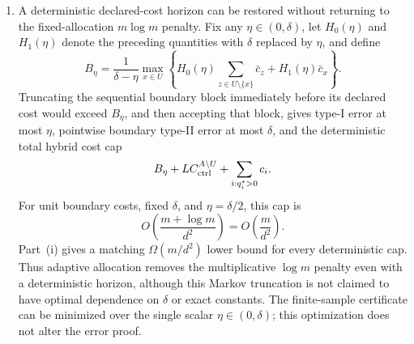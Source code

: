 \begin{theorem}
\begin{enumerate}[label=(\roman*)]
\item A deterministic declared-cost horizon can be restored without returning
to the fixed-allocation \(m\log m\) penalty.  Fix any
\(\eta\in(0,\delta)\), let \(H_0(\eta)\) and \(H_1(\eta)\) denote the preceding
quantities with \(\delta\) replaced by \(\eta\), and define
\begin{equation}\label{eq:formal-results-066}
B_\eta
=
\frac1{\delta-\eta}
\max_{x\in U}
\left\{
H_0(\eta)\sum_{z\in U\setminus\{x\}}\bar c_z
+H_1(\eta)\bar c_x
\right\}.
\end{equation}
Truncating the sequential boundary block immediately before its declared cost
would exceed \(B_\eta\), and then accepting that block, gives type-I error at
most \(\eta\), pointwise boundary type-II error at most \(\delta\), and the
deterministic total hybrid cost cap
\begin{equation}\label{eq:formal-results-067}
B_\eta
+L C_{\rm ctrl}^{A\setminus U}
+\sum_{i:q_i^\star>0}c_i.
\end{equation}
For unit boundary costs, fixed \(\delta\), and \(\eta=\delta/2\), this cap is
\begin{equation}\label{eq:formal-results-068}
O\!\left(\frac{m+\log m}{d^2}\right)
=O\!\left(\frac{m}{d^2}\right).
\end{equation}
Part~(i) gives a matching \(\Omega(m/d^2)\) lower bound for every deterministic
cap.  Thus adaptive allocation removes the multiplicative \(\log m\) penalty
even with a deterministic horizon, although this Markov truncation is not
claimed to have optimal dependence on \(\delta\) or exact constants.  The
finite-sample certificate can be minimized over the single scalar
\(\eta\in(0,\delta)\); this optimization does not alter the error proof.
\end{enumerate}
\end{theorem}

